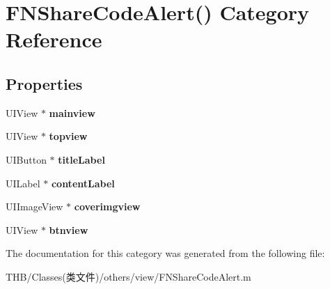 \hypertarget{category_f_n_share_code_alert_07_08}{}\section{F\+N\+Share\+Code\+Alert() Category Reference}
\label{category_f_n_share_code_alert_07_08}
\subsection*{Properties}
\begin{DoxyCompactItemize}
\item 
\mbox{\label{category_f_n_share_code_alert_07_08_a7ecb8733f116fa634ff431e3df2b60f4}} 
U\+I\+View $\ast$ {\bfseries mainview}
\item 
\mbox{\label{category_f_n_share_code_alert_07_08_a41e6e70bb141a6f61d3a7c63dcdbde15}} 
U\+I\+View $\ast$ {\bfseries topview}
\item 
\mbox{\label{category_f_n_share_code_alert_07_08_aa7211c589edd520782e1202adb3878ac}} 
U\+I\+Button $\ast$ {\bfseries title\+Label}
\item 
\mbox{\label{category_f_n_share_code_alert_07_08_a47e6af235e6b9d7be158bd3a69595ad6}} 
U\+I\+Label $\ast$ {\bfseries content\+Label}
\item 
\mbox{\label{category_f_n_share_code_alert_07_08_a202605a3213b275387324f89ade996bc}} 
U\+I\+Image\+View $\ast$ {\bfseries coverimgview}
\item 
\mbox{\label{category_f_n_share_code_alert_07_08_ad3f7dcc63fec2015fea37eda7f5c6d1f}} 
U\+I\+View $\ast$ {\bfseries btnview}
\end{DoxyCompactItemize}


The documentation for this category was generated from the following file\+:\begin{DoxyCompactItemize}
\item 
T\+H\+B/\+Classes(类文件)/others/view/F\+N\+Share\+Code\+Alert.\+m\end{DoxyCompactItemize}
